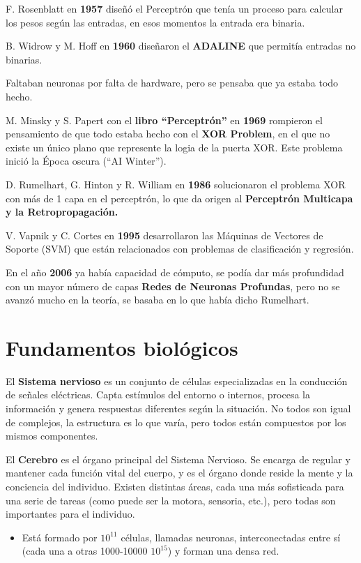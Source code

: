 \documentclass[12pt, twoside, openright]{report} %
\begin{document}
F. Rosenblatt en \textbf{1957} diseñó el Perceptrón que tenía un proceso para calcular los pesos según las entradas, en esos momentos la entrada era binaria.

B. Widrow y M. Hoff en \textbf{1960} diseñaron el \textbf{ADALINE} que permitía entradas no binarias.

Faltaban neuronas por falta de hardware, pero se pensaba que ya estaba todo hecho.

M. Minsky y S. Papert con el \textbf{libro “Perceptrón”} en \textbf{1969} rompieron el pensamiento de que todo estaba hecho con el \textbf{XOR Problem}, en el que no existe un único plano que represente la logia de la puerta XOR. Este problema inició la Época oscura (“AI Winter”).

D. Rumelhart, G. Hinton y R. William en \textbf{1986} solucionaron el problema XOR con más de 1 capa en el perceptrón, lo que da origen al \textbf{Perceptrón Multicapa y la Retropropagación.}

V. Vapnik y C. Cortes en \textbf{1995} desarrollaron las Máquinas de Vectores de Soporte (SVM) que están relacionados con problemas de clasificación y regresión.

En el año \textbf{2006} ya había capacidad de cómputo, se podía dar más profundidad con un mayor número de capas \textbf{Redes de Neuronas Profundas}, pero no se avanzó mucho en la teoría, se basaba en lo que había dicho Rumelhart.

\section{Fundamentos biológicos}
El \textbf{Sistema nervioso} es un conjunto de células especializadas en la conducción de señales eléctricas. Capta estímulos del entorno o internos, procesa la información y genera respuestas diferentes según la situación. No todos son igual de complejos, la estructura es lo que varía, pero todos están compuestos por los mismos componentes.

El \textbf{Cerebro} es el órgano principal del Sistema Nervioso. Se encarga de regular y mantener cada función vital del cuerpo, y es el órgano donde reside la mente y la conciencia del individuo. Existen distintas áreas, cada una más sofisticada para una serie de tareas (como puede ser la motora, sensoria, etc.), pero todas son importantes para el individuo.
\begin{itemize}
	\item Está formado por $10^{11}$ células, llamadas neuronas, interconectadas entre sí (cada una a otras 1000-10000 $10^{15}$) y forman una densa red.
\end{itemize}
\end{document}
